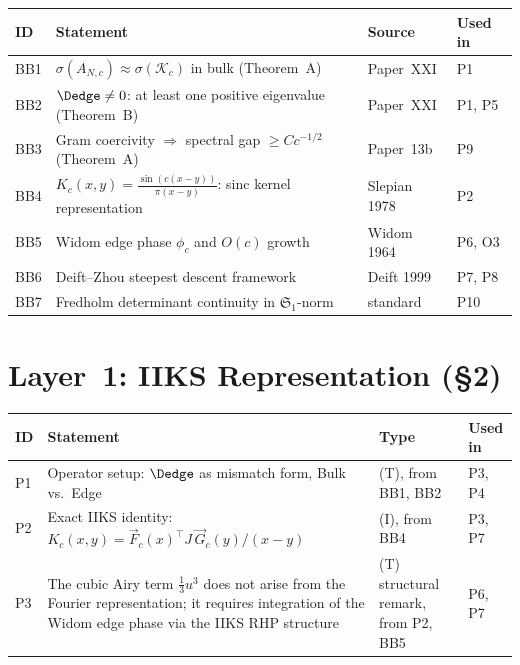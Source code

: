 \documentclass[12pt,a4paper]{amsart}
\theoremstyle{definition}
\begin{document}
\begin{center}
\renewcommand{\arraystretch}{1.35}
\begin{tabular}{l p{5.5cm} l l}
\toprule
\textbf{ID} & \textbf{Statement} & \textbf{Source} & \textbf{Used in} \\
\midrule
BB1 & $\sigma(A_{N,c})\approx\sigma(\mathcal{K}_c)$ in bulk
    (Theorem~A)
    & Paper~XXI
    & P1 \\
BB2 & $\Dedge\ne 0$: at least one positive eigenvalue
    (Theorem~B)
    & Paper~XXI
    & P1, P5 \\
BB3 & Gram coercivity $\Rightarrow$ spectral gap
    $\ge Cc^{-1/2}$ (Theorem~A)
    & Paper~13b
    & P9 \\
BB4 & $K_c(x,y)=\frac{\sin(c(x-y))}{\pi(x-y)}$:
    sinc kernel representation
    & Slepian 1978
    & P2 \\
BB5 & Widom edge phase $\phi_c$
    and $O(c)$ growth
    & Widom 1964
    & P6, O3 \\
BB6 & Deift--Zhou steepest descent framework
    & Deift 1999
    & P7, P8 \\
BB7 & Fredholm determinant continuity
    in $\mathfrak{S}_1$-norm
    & standard
    & P10 \\
\bottomrule
\end{tabular}
\end{center}

\section{Layer~1: IIKS Representation (\S2)}
\label{sec:L1}

\begin{center}
\renewcommand{\arraystretch}{1.35}
\begin{tabular}{l p{5.5cm} l l}
\toprule
\textbf{ID} & \textbf{Statement} & \textbf{Type} & \textbf{Used in} \\
\midrule
P1 & Operator setup: $\Dedge$
    as mismatch form, Bulk vs.\ Edge
    & (T), from BB1, BB2
    & P3, P4 \\
P2 & Exact IIKS identity:
    $K_c(x,y) = \vec{F}_c(x)^\top J\,\vec{G}_c(y)/(x-y)$
    & (I), from BB4
    & P3, P7 \\
P3 & The cubic Airy term $\tfrac{1}{3}u^3$
    does not arise from the Fourier
    representation; it requires
    integration of the Widom edge phase
    via the IIKS RHP structure
    & (T) structural remark, from P2, BB5
    & P6, P7 \\
\bottomrule
\end{tabular}
\end{center}
\end{document}
